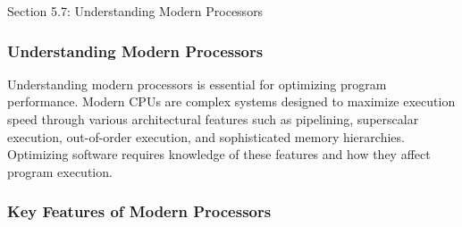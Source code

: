 \begin{notes}{Section 5.7: Understanding Modern Processors}
    \subsubsection*{Understanding Modern Processors}

    Understanding modern processors is essential for optimizing program performance. Modern CPUs are complex systems designed to maximize execution speed through various architectural features such as 
    pipelining, superscalar execution, out-of-order execution, and sophisticated memory hierarchies. Optimizing software requires knowledge of these features and how they affect program execution. \vspace*{1em}
    
    \subsubsection*{Key Features of Modern Processors}
    

\end{notes}
